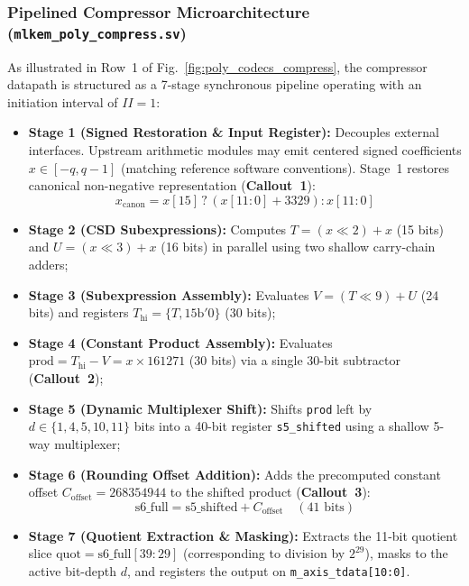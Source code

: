 \subsubsection{Pipelined Compressor Microarchitecture (\texttt{mlkem\_poly\_compress.sv})}
As illustrated in Row~1 of Fig.~\ref{fig:poly_codecs_compress}, the compressor datapath is structured as a 7-stage synchronous pipeline operating with an initiation interval of $II = 1$:
\begin{itemize}
    \item \textbf{Stage 1 (Signed Restoration \& Input Register):} Decouples external interfaces. Upstream arithmetic modules may emit centered signed coefficients $x \in [-q, q-1]$ (matching reference software conventions). Stage~1 restores canonical non-negative representation (\textbf{Callout~1}):
    \begin{equation}
    x_{\text{canon}} = x[15] \mathbin{?} (x[11:0] + 3329) : x[11:0]
    \end{equation}
    \item \textbf{Stage 2 (CSD Subexpressions):} Computes $T = (x \ll 2) + x$ (15 bits) and $U = (x \ll 3) + x$ (16 bits) in parallel using two shallow carry-chain adders;
    \item \textbf{Stage 3 (Subexpression Assembly):} Evaluates $V = (T \ll 9) + U$ (24 bits) and registers $T_{\text{hi}} = \{T, 15\text{b}'0\}$ (30 bits);
    \item \textbf{Stage 4 (Constant Product Assembly):} Evaluates $\text{prod} = T_{\text{hi}} - V = x \times 161271$ (30 bits) via a single 30-bit subtractor (\textbf{Callout~2});
    \item \textbf{Stage 5 (Dynamic Multiplexer Shift):} Shifts \texttt{prod} left by $d \in \{1, 4, 5, 10, 11\}$ bits into a 40-bit register \texttt{s5\_shifted} using a shallow 5-way multiplexer;
    \item \textbf{Stage 6 (Rounding Offset Addition):} Adds the precomputed constant offset $C_{\text{offset}} = 268354944$ to the shifted product (\textbf{Callout~3}):
    \begin{equation}
    \text{s6\_full} = \text{s5\_shifted} + C_{\text{offset}} \quad (41\text{ bits})
    \end{equation}
    \item \textbf{Stage 7 (Quotient Extraction \& Masking):} Extracts the 11-bit quotient slice $\text{quot} = \text{s6\_full}[39:29]$ (corresponding to division by $2^{29}$), masks to the active bit-depth $d$, and registers the output on \texttt{m\_axis\_tdata[10:0]}.
\end{itemize}

